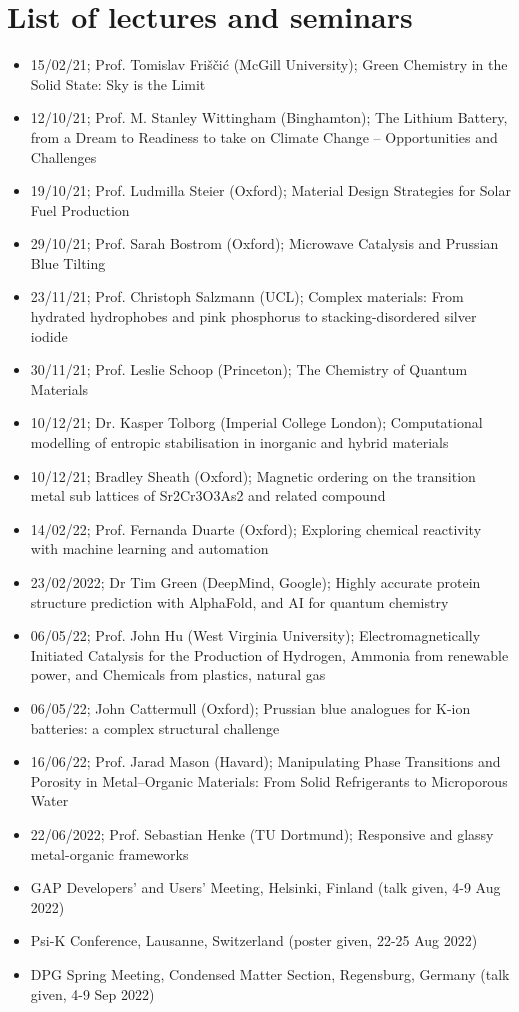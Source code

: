 \documentclass[12pt,a4paper,twoside,nobind]{ociamthesis}
\begin{document}
\section*{List of lectures and seminars}

\begin{itemize}
  \item 15/02/21; Prof. Tomislav Friščić (McGill University); Green Chemistry in the Solid State: Sky is the Limit
  \item 12/10/21;	Prof. M. Stanley Wittingham (Binghamton);	The Lithium Battery, from a Dream to Readiness to take on Climate Change – Opportunities and Challenges
  \item 19/10/21;	Prof. Ludmilla Steier (Oxford);	Material Design Strategies for Solar Fuel Production
  \item 29/10/21;	Prof. Sarah Bostrom (Oxford);	Microwave Catalysis and Prussian Blue Tilting
  \item 23/11/21;	Prof. Christoph Salzmann (UCL);	Complex materials: From hydrated hydrophobes and pink phosphorus to stacking-disordered silver iodide
  \item 30/11/21;	Prof. Leslie Schoop (Princeton);	The Chemistry of Quantum Materials
  \item 10/12/21; Dr. Kasper Tolborg (Imperial College London); Computational modelling of entropic stabilisation in inorganic and hybrid materials
  \item 10/12/21; Bradley Sheath (Oxford); Magnetic ordering on the transition metal sub lattices of Sr2Cr3O3As2 and related compound
  \item 14/02/22;	Prof. Fernanda Duarte (Oxford);	Exploring chemical reactivity with machine learning and automation
  \item 23/02/2022; Dr Tim Green (DeepMind, Google); Highly accurate protein structure prediction with AlphaFold, and AI for quantum chemistry
  \item 06/05/22; Prof. John Hu (West Virginia University); Electromagnetically Initiated Catalysis for the Production of Hydrogen, Ammonia from renewable power, and Chemicals from plastics, natural gas
  \item 06/05/22; John Cattermull (Oxford); Prussian blue analogues for K-ion batteries: a complex structural challenge
  \item 16/06/22; Prof. Jarad Mason (Havard); Manipulating Phase Transitions and Porosity in Metal–Organic Materials: From Solid Refrigerants to Microporous Water
  \item 22/06/2022; Prof. Sebastian Henke (TU Dortmund); Responsive and glassy metal-organic frameworks
  \item GAP Developers' and Users' Meeting, Helsinki, Finland (talk given, 4-9 Aug 2022)
  \item Psi-K Conference, Lausanne, Switzerland (poster given, 22-25 Aug 2022)
  \item DPG Spring Meeting, Condensed Matter Section, Regensburg, Germany (talk given, 4-9 Sep 2022)
\end{itemize}
\end{document}
